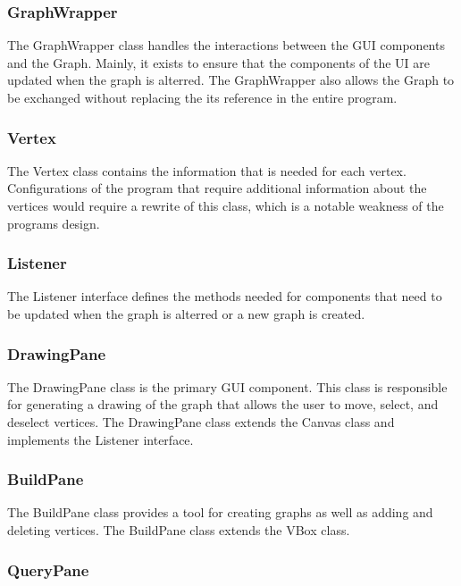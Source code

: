 \documentclass{article}
\begin{document}
\subsubsection{GraphWrapper}

The GraphWrapper class handles the interactions between the GUI components and the Graph.
Mainly, it exists to ensure that the components of the UI are updated when the graph is alterred.
The GraphWrapper also allows the Graph to be exchanged without replacing the its reference in the entire program.

\subsubsection{Vertex}

The Vertex class contains the information that is needed for each vertex.
Configurations of the program that require additional information about the vertices would require a rewrite of this class,
which is a notable weakness of the programs design. 

\subsubsection{Listener}

The Listener interface defines the methods needed for components that need to be updated when the graph is alterred
or a new graph is created.

\subsubsection{DrawingPane}

The DrawingPane class is the primary GUI component. This class is responsible for generating a drawing of the graph
that allows the user to move, select, and deselect vertices.
The DrawingPane class extends the Canvas class and implements the Listener interface.

\subsubsection{BuildPane}

The BuildPane class provides a tool for creating graphs as well as adding and deleting vertices.
The BuildPane class extends the VBox class.

\subsubsection{QueryPane}
\end{document}
